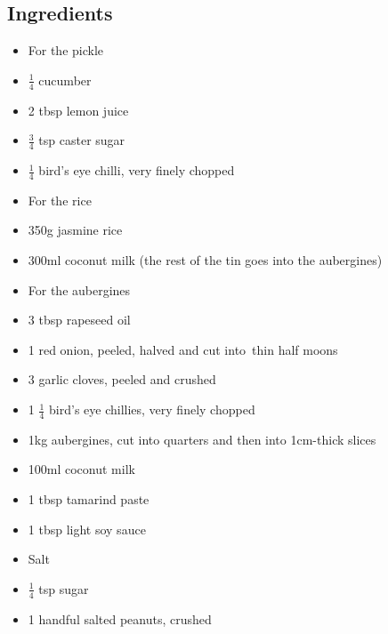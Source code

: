 \documentclass{book}
\begin{document}
\subsection*{Ingredients}
\begin{itemize}
\item For the pickle 
\item $\frac{1}{4}$ cucumber 
\item 2 tbsp lemon juice 
\item $\frac{3}{4}$ tsp caster sugar 
\item $\frac{1}{4}$ bird’s eye chilli, very finely chopped 
\end{itemize}

\begin{itemize}
\item For the rice 
\item 350g jasmine rice 
\item 300ml coconut milk (the rest of the tin goes into the aubergines) 
\end{itemize}

\begin{itemize}
\item For the aubergines
\item 3 tbsp rapeseed oil 
\item 1 red onion, peeled, halved and cut into thin half moons 
\item 3 garlic cloves, peeled and crushed 
\item 1 $\frac{1}{4}$ bird’s eye chillies, very finely chopped 
\item 1kg aubergines, cut into quarters and then into 1cm-thick slices 
\item 100ml coconut milk 
\item 1 tbsp tamarind paste 
\item 1 tbsp light soy sauce 
\item Salt 
\item $\frac{1}{4}$ tsp sugar 
\item 1 handful salted peanuts, crushed 
\end{itemize}
\end{document}

